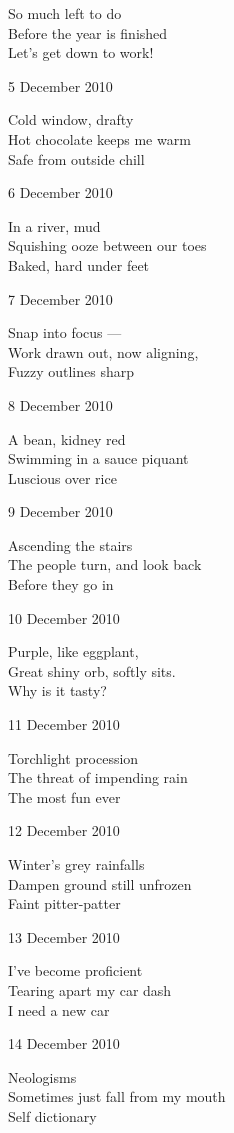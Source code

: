 \documentclass[12pt]{article}
\begin{document}
So much left to do \\
Before the year is finished \\
Let's get down to work!

5 December 2010

Cold window, drafty \\
Hot chocolate keeps me warm \\
Safe from outside chill

6 December 2010

In a river, mud \\
Squishing ooze between our toes \\
Baked, hard under feet

7 December 2010

Snap into focus --- \\
Work drawn out, now aligning, \\
Fuzzy outlines sharp

8 December 2010

A bean, kidney red \\
Swimming in a sauce piquant \\
Luscious over rice

9 December 2010

Ascending the stairs \\
The people turn, and look back \\
Before they go in

10 December 2010

Purple, like eggplant, \\
Great shiny orb, softly sits. \\
Why is it tasty?

\newpage

11 December 2010

Torchlight procession \\
The threat of impending rain \\
The most fun ever

12 December 2010

Winter's grey rainfalls \\
Dampen ground still unfrozen \\
Faint pitter-patter

13 December 2010

I've become proficient \\
Tearing apart my car dash \\
I need a new car

14 December 2010

Neologisms \\
Sometimes just fall from my mouth \\
Self dictionary
\end{document}
